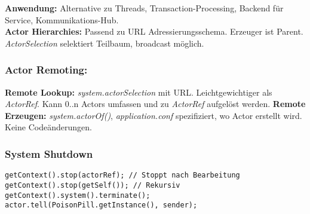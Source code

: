 \textbf{Anwendung:}
Alternative zu Threads, Transaction-Processing, 
Backend für Service, Kommunikations-Hub.\\ 
\textbf{Actor Hierarchies:}
Passend zu URL Adressierungsschema. Erzeuger ist Parent. 
\textit{ActorSelection} selektiert Teilbaum, broadcast möglich.

\subsubsection{Actor Remoting:}
\textbf{Remote Lookup:} \textit{system.actorSelection} mit URL.
Leichtgewichtiger als \textit{ActorRef}.
Kann 0..n Actors umfassen und zu \textit{ActorRef} aufgelöst werden.
\textbf{Remote Erzeugen:} \textit{system.actorOf()}, \textit{application.conf} spezifiziert, wo Actor erstellt wird.
Keine Codeänderungen.

\subsubsection{System Shutdown}
\begin{lstlisting}
getContext().stop(actorRef); // Stoppt nach Bearbeitung
getContext().stop(getSelf()); // Rekursiv
getContext().system().terminate();
actor.tell(PoisonPill.getInstance(), sender); 
\end{lstlisting}